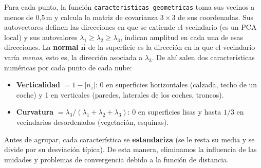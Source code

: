 \documentclass{article}
\begin{document}
\begin{tcolorbox}[colback=gray!5!white, colframe=gray!60!black, title=\textbf{Características geométricas (ya calculadas)}]
Para cada punto, la función \texttt{caracteristicas\_geometricas} toma sus vecinos a menos de 0{,}5\,m y calcula la matriz de covarianza $3 \times 3$ de sus coordenadas. Sus autovectores definen las direcciones en que se extiende el vecindario (es un PCA local) y sus autovalores $\lambda_1 \geq \lambda_2 \geq \lambda_3$, indican amplitud en cada una de esas direcciones. La \textbf{normal} $\mathbf{\vec{n}}$ de la superficie es la dirección en la que el vecindario varía \emph{menos}, esto es, la dirección asociada a $\lambda_3$. De ahí salen dos características numéricas por cada punto de cada nube:
\begin{itemize}
    \item \textbf{Verticalidad} $= 1 - |n_z|$: 0 en superficies horizontales (calzada, techo de un coche) y 1 en verticales (paredes, laterales de los coches, troncos).
    \item \textbf{Curvatura} $= \lambda_3 / (\lambda_1 + \lambda_2 + \lambda_3)$: 0 en superficies lisas y hasta $1/3$ en vecindarios desordenados (vegetación, esquinas).
\end{itemize}
Antes de agrupar, cada característica se \textbf{estandariza} (se le resta su media y se divide por su desviación típica). De esta manera, eliminamos la influencia de las unidades y problemas de convergencia debido a la función de distancia.
\end{tcolorbox}
\end{document}
